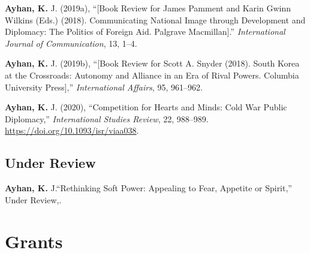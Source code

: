 \documentclass[11pt,a4paper,]{awesome-cv}
\begin{document}
\leavevmode{}%
\textbf{Ayhan, K.} J. (2019a), {``{[}{Book} {Review} for {James}
{Pamment} and {Karin} {Gwinn} {Wilkins} ({Eds}.) (2018). {Communicating}
{National} {Image} through {Development} and {Diplomacy}: {The}
{Politics} of {Foreign} {Aid}. {Palgrave} {Macmillan}{]}.''}
\emph{International Journal of Communication}, 13, 1--4.

\leavevmode{}%
\textbf{Ayhan, K.} J. (2019b), {``{[}{Book} {Review} for {Scott} {A}.
{Snyder} (2018). {South} {Korea} at the {Crossroads}: {Autonomy} and
{Alliance} in an {Era} of {Rival} {Powers}. {Columbia} {University}
{Press}{]},''} \emph{International Affairs}, 95, 961--962.

\leavevmode{}%
\textbf{Ayhan, K.} J. (2020), {``Competition for {Hearts} and {Minds}:
{Cold} {War} {Public} {Diplomacy},''} \emph{International Studies
Review}, 22, 988--989. \url{https://doi.org/10.1093/isr/viaa038}.

\hypertarget{under-review}{%
\subsection{Under Review}\label{under-review}}

\hypertarget{refs_under}{}
\leavevmode{}%
\textbf{Ayhan, K.} J.{``{Rethinking Soft Power: Appealing to Fear,
Appetite or Spirit},''} Under Review,.

\hypertarget{grants}{%
\section{Grants}\label{grants}}
\end{document}
